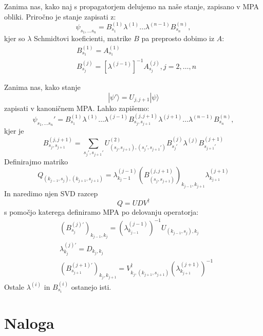 \documentclass{article}
\begin{document}
Zanima nas, kako naj s propagatorjem delujemo na naše stanje, zapisano v MPA obliki.
Priročno je stanje zapisati z:
\begin{equation*}
\psi_{s_1, \dots s_n} = B_{s_1}^{(1)} \lambda^{(1)} \dots \lambda^{(n-1)} B_{s_n}^{(n)},
\end{equation*} 
kjer so $\lambda $ Schmidtovi koeficienti, matrike $B$ pa preprosto dobimo iz $A$:
\begin{align*}
& B_{s_1}^{(1)} = A_{s_1}^{(1)} \\
&B_{s_j}^{(j)} = [ \lambda^{(j-1)}]^{-1} A_{s_j}^{(j)} , j = 2, \dots , n
\end{align*}

Zanima nas, kako stanje
\begin{equation*}
|\psi' \rangle = U_{j,j+1} |\psi \rangle
\end{equation*}
zapisati v kanoničnem MPA.
Lahko zapišemo:
\begin{equation*}
\psi_{s_1, \dots s_n}' = B_{s_1}^{(1)} \lambda^{(1)} \dots \lambda^{(j-1)} B_{s_j, s_{j+1}}^{(j,j+1)} \lambda^{(j+1)} \dots \lambda^{(n-1)} B_{s_n}^{(n)},
\end{equation*}
kjer je
\begin{equation*}
B_{s_j, s_{j+1}}^{(j,j+1)} = \sum_{s_j' , s_{j+1}'} U^{(2)}_{(s_j, s_{j+1}), (s_j', s_{j+1}')} B_{s_j'}^{(j)} \lambda^{(j)} B_{s_{j+1}'}^{(j+1)}
\end{equation*}
Definirajmo matriko
\begin{equation*}
Q_{(k_{j-1}, s_j), (k_{j+1},s_{j+1})} = \lambda_{k_j-1}^{(j-1)} \left(B_{(s_j, s_{j+1})}^{(j,j+1)} \right)_{k_{j-1}, k_{j+1}} \lambda_{k_{j+1}}^{(j+1)}
\end{equation*}
In naredimo njen SVD razcep
\begin{equation*}
Q  = U D V^\dagger
\end{equation*}
s pomočjo katerega definiramo MPA po delovanju operatorja:
\begin{align*}
&(B_{s_j}^{(j)\prime})_{k_{j-1},k_j} = (\lambda^{(j-1)}_{k_{j-1}})^{-1} U_{(k_{j-1},s_j),k_j} \\
& \lambda_{k_j}^{(j)\prime} = D_{k_j, k_j} \\
&(B_{s_{j+1}}^{(j+1) \prime})_{k_j,k_{j+1}} = V^\dagger_{k_j,(k_{j+1},s_{j+1})}  (\lambda_{k_{j+1}}^{(j+1)})^{-1}
\end{align*}
Ostale $\lambda^{(i)}$ in $B^{(i)}_{s_i}$ ostanejo isti.

\section*{Naloga}
\end{document}
